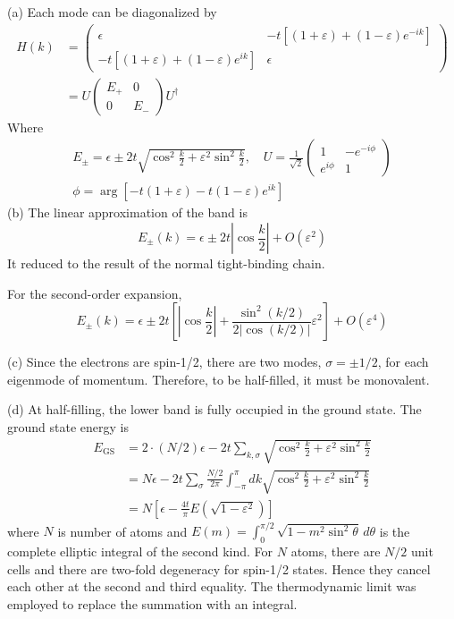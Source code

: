 \documentclass[a4paper,11pt]{article}
\begin{document}
(a) Each mode can be diagonalized by
\begin{align}
    H(k)
    &=\begin{pmatrix}
        \epsilon & -t[(1+\varepsilon) + (1-\varepsilon)e^{-ik}] \\
        -t[(1+\varepsilon) + (1-\varepsilon)e^{ik}] & \epsilon
    \end{pmatrix}\\
    &=U\begin{pmatrix}
        E_+ & 0\\
        0 & E_-
    \end{pmatrix}U^\dagger
\end{align}
Where 
\begin{gather}
        E_\pm = \epsilon \pm 2t\sqrt{\cos^2\frac{k}{2}+ \varepsilon^2\sin^2\frac{k}{2}}, \quad U=\frac{1}{\sqrt 2}\begin{pmatrix}
        1 & -e^{-i\phi} \\
        e^{i\phi} & 1
    \end{pmatrix} \\
    \phi = \arg\left[-t(1+\varepsilon) - t(1-\varepsilon)e^{ik}\right]
\end{gather}
(b) The linear approximation of the band is
\begin{equation}
    E_\pm(k)=\epsilon \pm 2t\left|\cos \frac{k}{2}\right| + O(\varepsilon^2)
\end{equation}
It reduced to the result of the normal tight-binding chain.

For the second-order expansion,
\begin{equation}
    E_\pm(k)=\epsilon \pm 2t\left[\left|\cos \frac{k}{2}\right| + \frac{\sin^2(k/2)}{2\left|\cos (k/2)\right|}\varepsilon^2\right] + O(\varepsilon^4)
\end{equation}

(c) Since the electrons are spin-1/2, there are two modes, $\sigma=\pm1/2$, for each eigenmode of momentum. Therefore, to be half-filled, it must be monovalent. 

(d) At half-filling, the lower band is fully occupied in the ground state. The ground state energy is
\begin{align}
    E_\text{GS}
    &=2\cdot (N/2)\epsilon - 2t\sum_{k,\sigma}\sqrt{\cos^2\frac{k}{2}+ \varepsilon^2\sin^2\frac{k}{2}} \\
    &=N\epsilon - 2t\sum_\sigma\frac{N/2}{2\pi}\int_{-\pi}^{\pi}dk\sqrt{\cos^2\frac{k}{2}+ \varepsilon^2\sin^2\frac{k}{2}} \\
    &=N\left[\epsilon-\frac{4t}{\pi}E\left(\sqrt{1-\varepsilon^2}\right) \right]
\end{align}
where $N$ is number of atoms and $E(m)=\int_0^{\pi/2} \sqrt{1-m^2\sin^2\theta} \, d\theta$ is the complete elliptic integral of the second kind. For $N$ atoms, there are $N/2$ unit cells and there are two-fold degeneracy for spin-1/2 states. Hence they cancel each other at the second and third equality. The thermodynamic limit was employed to replace the summation with an integral.
\end{document}
